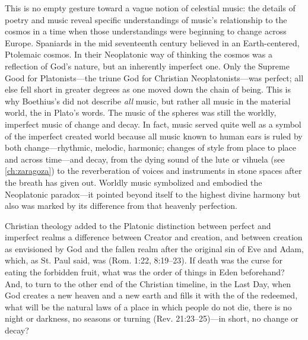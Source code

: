 This is no empty gesture toward a vague notion of celestial music: the details
of poetry and music reveal specific understandings of music's relationship to
the cosmos in a time when those understandings were beginning to change across
Europe. 
Spaniards in the mid seventeenth century believed in an Earth-centered,
Ptolemaic cosmos.
In their Neoplatonic way of thinking the cosmos was a reflection of God's
nature, but an inherently imperfect one.
Only the Supreme Good for Platonists---the triune God for Christian
Neoplatonists---was perfect; all else fell short in greater degrees as one
moved down the chain of being. 
This is why Boethius's  did not describe \emph{all} music,
but rather all music in the material world, the  in Plato's words.
The music of the spheres was still the worldly, imperfect music of change and
decay.
In fact, music served quite well as a symbol of the imperfect created world
because all music known to human ears is ruled by both change---rhythmic,
melodic, harmonic; changes of style from place to place and across time---and
decay, from the dying sound of the lute or vihuela (see \cref{ch:zaragoza}) to
the reverberation of voices and instruments in stone spaces after the breath has
given out.
Worldly music symbolized and embodied the Neoplatonic paradox---it pointed
beyond itself to the highest divine harmony but also was marked by its
difference from that heavenly perfection.

Christian theology added to the Platonic distinction between perfect and
imperfect realms a difference between Creator and creation, and between creation
as envisioned by God and the fallen realm after the original sin of Eve and
Adam, which, as St. Paul said, was  (Rom.
1:22, 8:19--23).
If death was the curse for eating the forbidden fruit, what was the order of
things in Eden beforehand?
And, to turn to the other end of the Christian timeline, in the Last Day, when
God creates a new heaven and a new earth and fills it with the  of the redeemed, what will be the natural laws of a place in which
people do not die, there is no night or darkness, no seasons or turning (Rev.
21:23--25)---in short, no change or decay?

